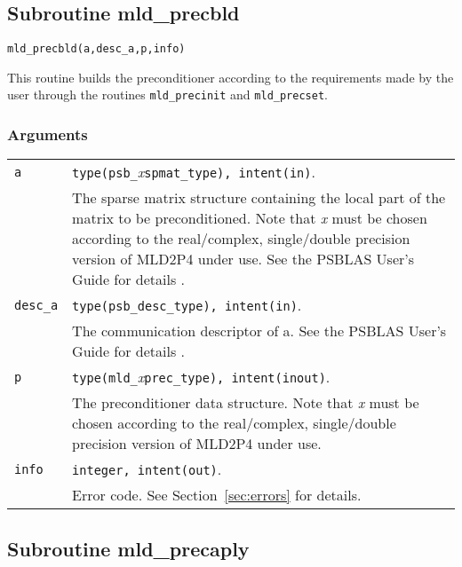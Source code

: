 \clearpage
\subsection{Subroutine mld\_precbld\label{sec:precbld}}

\begin{center}
\verb|mld_precbld(a,desc_a,p,info)|\\
\end{center}

\noindent
This routine builds the preconditioner according to the requirements made by
the user through the routines \verb|mld_precinit| and \verb|mld_precset|.

\subsubsection*{Arguments}

\begin{tabular}{p{1.2cm}p{11.5cm}}
\verb|a|      & \verb|type(psb_|\emph{x}\verb|spmat_type), intent(in)|. \\
              & The sparse matrix structure containing the local part of the
                matrix to be preconditioned. Note that \emph{x} must be chosen according
                to the real/complex, single/double precision version of MLD2P4 under use.
                See the PSBLAS User's Guide for details \cite{PSBLASGUIDE}.\\
\verb|desc_a| & \verb|type(psb_desc_type), intent(in)|. \\
              & The communication descriptor of a. See the PSBLAS User's Guide for
                details \cite{PSBLASGUIDE}.\\
\verb|p|      & \verb|type(mld_|\emph{x}\verb|prec_type), intent(inout)|.\\
              & The preconditioner data structure. Note that \emph{x} must be chosen according
                to the real/complex, single/double precision version of MLD2P4 under use.\\
\verb|info|   & \verb|integer, intent(out)|.\\
              & Error code. See Section~\ref{sec:errors} for details.\\
\end{tabular}

\clearpage
\subsection{Subroutine mld\_precaply\label{sec:precaply}}

